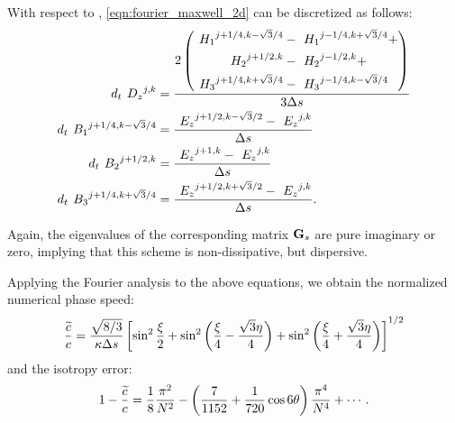 With respect to , \eqref{eqn:fourier_maxwell_2d}
can be discretized as follows:
\begin{equation} \label{eqn:fourier_hexagonal_grid} \begin{split}
    d_t {\ }^{}{D_z}^{j,k} & = \frac{2 \left( \begin{aligned}
	{\ }^{}{H_1}^{j+1/4,k-\sqrt{3}/4} & -
	{\ }^{}{H_1}^{j-1/4,k+\sqrt{3}/4} + \\
	{\ }^{}{H_2}^{j+1/2,k} & - {\ }^{}{H_2}^{j-1/2,k} + \\
	{\ }^{}{H_3}^{j+1/4,k+\sqrt{3}/4} & -
	{\ }^{}{H_3}^{j-1/4,k-\sqrt{3}/4}
    \end{aligned} \right)}{3 \Delta s} \\
    d_t {\ }^{}{B_1}^{j+1/4,k-\sqrt{3}/4} & =
    \frac{{\ }^{}{E_z}^{j+1/2,k-\sqrt{3}/2} - {\ }^{}{E_z}^{j,k}}{\Delta s} \\
    d_t {\ }^{}{B_2}^{j+1/2,k} & = \frac{{\ }^{}{E_z}^{j+1,k} -
    {\ }^{}{E_z}^{j,k}}{\Delta s} \\
    d_t {\ }^{}{B_3}^{j+1/4,k+\sqrt{3}/4} & =
    \frac{{\ }^{}{E_z}^{j+1/2,k+\sqrt{3}/2} - {\ }^{}{E_z}^{j,k}}{\Delta s} .
\end{split} \end{equation}

Again, the eigenvalues of the corresponding matrix $\mathbf{G}_s$ are
pure imaginary or zero, implying that this scheme is non-dissipative,
but dispersive.

Applying the Fourier analysis to the above equations, we obtain the
normalized numerical phase speed:
\begin{equation}
  \frac{\widetilde{c}}{c} = \frac{\sqrt{8/3}}{\kappa \Delta s}\left[
  \sin^2 \frac{\xi}{2} + \sin^2 \left(\frac{\xi}{4} -
  \frac{\sqrt{3}\eta}{4}\right) + \sin^2 \left(\frac{\xi}{4} +
  \frac{\sqrt{3}\eta}{4}\right)\right]^{1/2}
\end{equation}
and the isotropy error:
\begin{equation}
  1-\frac{\widetilde{c}}{c} = \frac{1}{8}\frac{\pi^2}{N^2} -
  \left(\frac{7}{1152} + \frac{1}{720} \cos 6\theta\right) \frac{\pi^4}{N^4} +
  \dotsb .
\end{equation}

